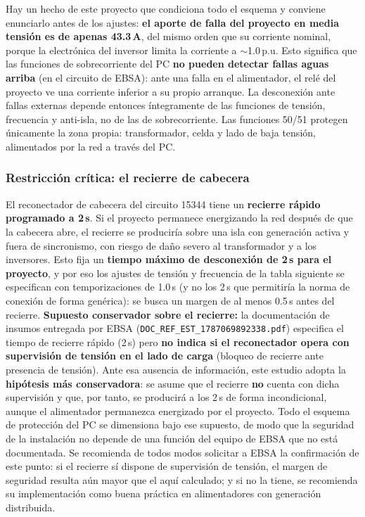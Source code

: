 \documentclass[11pt,a4paper]{article}
\begin{document}
Hay un hecho de este proyecto que condiciona todo el esquema y conviene enunciarlo antes de los ajustes: \textbf{el aporte de falla del proyecto en media tensi\'on es de apenas 43.3\,A}, del mismo orden que su corriente nominal, porque la electr\'onica del inversor limita la corriente a $\sim$1.0\,p.u. Esto significa que las funciones de sobrecorriente del PC \textbf{no pueden detectar fallas aguas arriba} (en el circuito de EBSA): ante una falla en el alimentador, el rel\'e del proyecto ve una corriente inferior a su propio arranque. La desconexi\'on ante fallas externas depende entonces \'integramente de las funciones de tensi\'on, frecuencia y anti-isla, no de las de sobrecorriente. Las funciones 50/51 protegen \'unicamente la zona propia: transformador, celda y lado de baja tensi\'on, alimentados por la red a trav\'es del PC.

\subsubsection{Restricci\'on cr\'itica: el recierre de cabecera}

El reconectador de cabecera del circuito 15344 tiene un \textbf{recierre r\'apido programado a 2\,s}. Si el proyecto permanece energizando la red despu\'es de que la cabecera abre, el recierre se producir\'ia sobre una isla con generaci\'on activa y fuera de sincronismo, con riesgo de da\~no severo al transformador y a los inversores. Esto fija un \textbf{tiempo m\'aximo de desconexi\'on de 2\,s para el proyecto}, y por eso los ajustes de tensi\'on y frecuencia de la tabla siguiente se especifican con temporizaciones de 1.0\,s (y no los 2\,s que permitir\'ia la norma de conexi\'on de forma gen\'erica): se busca un margen de al menos 0.5\,s antes del recierre. \textbf{Supuesto conservador sobre el recierre:} la documentaci\'on de insumos entregada por EBSA (\texttt{DOC\_REF\_EST\_1787069892338.pdf}) especifica el tiempo de recierre r\'apido (2\,s) pero \textbf{no indica si el reconectador opera con supervisi\'on de tensi\'on en el lado de carga} (bloqueo de recierre ante presencia de tensi\'on). Ante esa ausencia de informaci\'on, este estudio adopta la \textbf{hip\'otesis m\'as conservadora}: se asume que el recierre \textbf{no} cuenta con dicha supervisi\'on y que, por tanto, se producir\'a a los 2\,s de forma incondicional, aunque el alimentador permanezca energizado por el proyecto. Todo el esquema de protecci\'on del PC se dimensiona bajo ese supuesto, de modo que la seguridad de la instalaci\'on no depende de una funci\'on del equipo de EBSA que no est\'a documentada. Se recomienda de todos modos solicitar a EBSA la confirmaci\'on de este punto: si el recierre s\'i dispone de supervisi\'on de tensi\'on, el margen de seguridad resulta a\'un mayor que el aqu\'i calculado; y si no la tiene, se recomienda su implementaci\'on como buena pr\'actica en alimentadores con generaci\'on distribuida.
\end{document}
